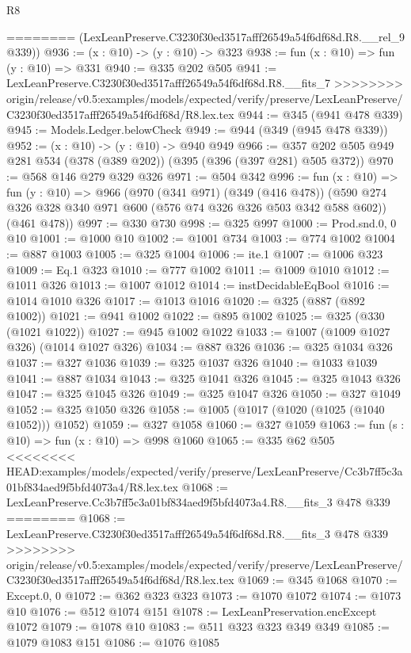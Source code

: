 \begin{lexlean}{R8}
\begin{coremodule}
{{{{{{{{{{{{{{{{{{{{{{{========
      (LexLeanPreserve.C3230f30ed3517afff26549a54f6df68d.R8.__rel_9 @339))
@936 := (x : @10) -> (y : @10) -> @323
@938 := fun (x : @10) => fun (y : @10) => @331
@940 := @335 @202 @505
@941 := LexLeanPreserve.C3230f30ed3517afff26549a54f6df68d.R8.__fits_7
>>>>>>>> origin/release/v0.5:examples/models/expected/verify/preserve/LexLeanPreserve/C3230f30ed3517afff26549a54f6df68d/R8.lex.tex
@944 := @345 (@941 @478 @339)
@945 := Models.Ledger.belowCheck
@949 := @944 (@349 (@945 @478 @339))
@952 := (x : @10) -> (y : @10) -> @940 @949
@966 := @357 @202 @505 @949 @281 @534 (@378 (@389 @202)) (@395 (@396 (@397 @281) @505 @372))
@970 := @568 @146 @279 @329 @326
@971 := @504 @342
@996 := fun (x : @10) =>
  fun (y : @10) =>
  @966
    (@970
      (@341 @971)
      (@349 (@416 @478))
      (@590 @274 @326 @328 @340 @971 @600 (@576 @74 @326 @326 @503 @342 @588 @602))
      (@461 @478))
@997 := @330 @730
@998 := @325 @997
@1000 := Prod.snd.{0, 0} @10
@1001 := @1000 @10
@1002 := @1001 @734
@1003 := @774 @1002
@1004 := @887 @1003
@1005 := @325 @1004
@1006 := ite.{1}
@1007 := @1006 @323
@1009 := Eq.{1} @323
@1010 := @777 @1002
@1011 := @1009 @1010
@1012 := @1011 @326
@1013 := @1007 @1012
@1014 := instDecidableEqBool
@1016 := @1014 @1010 @326
@1017 := @1013 @1016
@1020 := @325 (@887 (@892 @1002))
@1021 := @941 @1002
@1022 := @895 @1002
@1025 := @325 (@330 (@1021 @1022))
@1027 := @945 @1002 @1022
@1033 := @1007 (@1009 @1027 @326) (@1014 @1027 @326)
@1034 := @887 @326
@1036 := @325 @1034 @326
@1037 := @327 @1036
@1039 := @325 @1037 @326
@1040 := @1033 @1039
@1041 := @887 @1034
@1043 := @325 @1041 @326
@1045 := @325 @1043 @326
@1047 := @325 @1045 @326
@1049 := @325 @1047 @326
@1050 := @327 @1049
@1052 := @325 @1050 @326
@1058 := @1005 (@1017 (@1020 (@1025 (@1040 @1052))) @1052)
@1059 := @327 @1058
@1060 := @327 @1059
@1063 := fun (s : @10) => fun (x : @10) => @998 @1060
@1065 := @335 @62 @505
<<<<<<<< HEAD:examples/models/expected/verify/preserve/LexLeanPreserve/Cc3b7ff5c3a01bf834aed9f5bfd4073a4/R8.lex.tex
@1068 := LexLeanPreserve.Cc3b7ff5c3a01bf834aed9f5bfd4073a4.R8.__fits_3 @478 @339
========
@1068 := LexLeanPreserve.C3230f30ed3517afff26549a54f6df68d.R8.__fits_3 @478 @339
>>>>>>>> origin/release/v0.5:examples/models/expected/verify/preserve/LexLeanPreserve/C3230f30ed3517afff26549a54f6df68d/R8.lex.tex
@1069 := @345 @1068
@1070 := Except.{0, 0}
@1072 := @362 @323 @323
@1073 := @1070 @1072
@1074 := @1073 @10
@1076 := @512 @1074 @151
@1078 := LexLeanPreservation.encExcept @1072
@1079 := @1078 @10
@1083 := @511 @323 @323 @349 @349
@1085 := @1079 @1083 @151
@1086 := @1076 @1085
}}}}}}}}}}}}}}}}}}}}}}}
\end{coremodule}
\end{lexlean}
